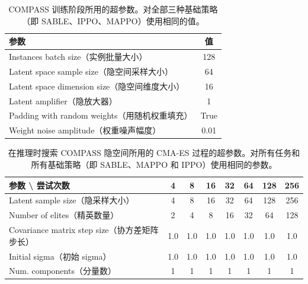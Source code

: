\documentclass[11pt,UTF8,fontset=fandol]{ctexart}
\begin{document}
\begin{table}[H]\centering
\caption{COMPASS 训练阶段所用的超参数。对全部三种基础策略（即 SABLE、IPPO、MAPPO）使用相同的值。}
\label{tab:2}
\begin{tabular}{lc}
\toprule
参数 & 值\\
\midrule
Instances batch size（实例批量大小） & 128\\
Latent space sample size（隐空间采样大小） & 64\\
Latent space dimension size（隐空间维度大小） & 16\\
Latent amplifier（隐放大器） & 1\\
Padding with random weights（用随机权重填充） & True\\
Weight noise amplitude（权重噪声幅度） & 0.01\\
\bottomrule
\end{tabular}
\end{table}

\begin{table}[H]\centering
\caption{在推理时搜索 COMPASS 隐空间所用的 CMA-ES 过程的超参数。对所有任务和所有基础策略（即 SABLE、MAPPO 和 IPPO）使用相同的参数。}
\label{tab:3}
\begin{tabular}{lccccccc}
\toprule
参数 \textbackslash{} 尝试次数 & 4 & 8 & 16 & 32 & 64 & 128 & 256\\
\midrule
Latent sample size（隐采样大小） & 4 & 8 & 16 & 32 & 64 & 128 & 256\\
Number of elites（精英数量） & 2 & 4 & 8 & 16 & 32 & 64 & 128\\
Covariance matrix step size（协方差矩阵步长） & 1.0 & 1.0 & 1.0 & 1.0 & 1.0 & 1.0 & 1.0\\
Initial sigma（初始 sigma） & 1.0 & 1.0 & 1.0 & 1.0 & 1.0 & 1.0 & 1.0\\
Num. components（分量数） & 1 & 1 & 1 & 1 & 1 & 1 & 1\\
\bottomrule
\end{tabular}
\end{table}
\end{document}
